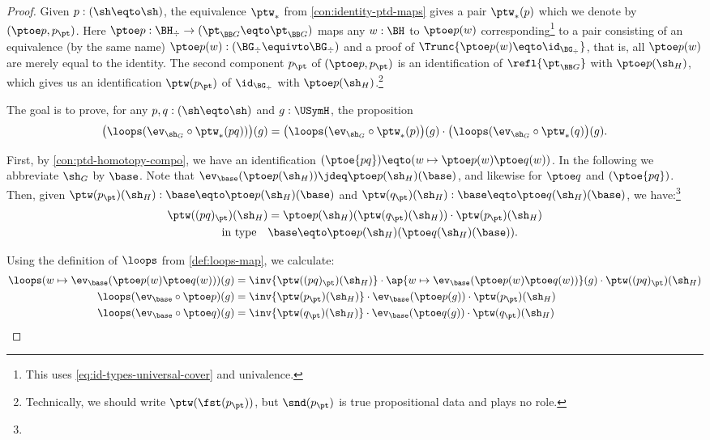 \begin{proof}
Given $p:(\sh\eqto\sh)$, the equivalence $\ptw_*$ from 
\cref{con:identity-ptd-maps} gives a pair $\ptw_*(p)$ which
we denote by $(\ptoe p,p_\pt)$. Here 
$\ptoe p :\BH_\div\to(\pt_{\BB G}\eqto\pt_{\BB G})$ maps any $w:\BH$ to 
$\ptoe p(w)$ corresponding\footnote{%
This uses \cref{eq:id-types-universal-cover} and univalence.}
to a pair consisting of an equivalence (by the same name)
$\ptoe p(w):(\BG_\div\equivto\BG_\div)$ and a proof of
$\Trunc{\ptoe p(w) \eqto \id_{\BG_\div}}$, that is,
all $\ptoe p(w)$ are merely equal to the identity.
The second component $p_\pt$ of $(\ptoe p,p_\pt)$ is an
identification of $\refl{\pt_{\BB G}}$ with $\ptoe p(\sh_H)$,
which gives us an identification $\ptw(p_\pt)$ of 
$\id_{\BG_\div}$ with $\ptoe p(\sh_H)$.\footnote{%
Technically, we should write $\ptw(\fst(p_\pt))$,
but $\snd(p_\pt)$ is true propositional data and plays no role.}

The goal is to prove, for any $p,q:(\sh\eqto\sh)$ and $g:\USymH$, 
the proposition
\[
\bigl(\loops(\ev_{\sh_G}\circ \ptw_*(pq))\bigr)(g) = 
\bigl(\loops(\ev_{\sh_G}\circ \ptw_*(p)\bigr)(g)\cdot
\bigl(\loops(\ev_{\sh_G}\circ \ptw_*(q)\bigr)(g).
\]

First, by \cref{con:ptd-homotopy-compo}, we have an identification 
$(\ptoe{pq})\eqto(w\mapsto \ptoe p(w) \ptoe q(w))$.
In the following we abbreviate $\sh_G$ by $\base$. 
Note that $\ev_\base(\ptoe p(\sh_H))\jdeq \ptoe p(\sh_H)(\base)$, 
and likewise for $\ptoe q$ and $(\ptoe{pq})$.
Then, given $\ptw(p_\pt)(\sh_H): \base \eqto \ptoe p(\sh_H)(\base)$
and $\ptw(q_\pt)(\sh_H) : \base \eqto \ptoe q(\sh_H)(\base)$,
we have:\footnote{}
\begin{align*}
\ptw((pq)_\pt)(\sh_H) &= \ptoe p(\sh_H)(\ptw(q_\pt)(\sh_H))\cdot \ptw(p_\pt)(\sh_H)\\
 \text{~in~type}\quad
&\base \eqto \ptoe p(\sh_H)(\ptoe q(\sh_H)(\base)).
\end{align*}

Using the definition of $\loops$ from \cref{def:loops-map},
we calculate:
\begin{align*}
\loops(w\mapsto \ev_{\base}(\ptoe p(w)\ptoe q(w)))(g) &= 
\inv{\ptw((pq)_\pt)(\sh_H)}\cdot \ap{w\mapsto \ev_{\base}(\ptoe p(w)\ptoe q(w))}(g) \cdot {\ptw((pq)_\pt)(\sh_H)}\\
\loops(\ev_{\base}\circ \ptoe p)(g) &= 
\inv{\ptw(p_\pt)(\sh_H)} \cdot \ev_{\base}(\ptoe p(g)) \cdot {\ptw(p_\pt)(\sh_H)}\\
\loops(\ev_{\base}\circ \ptoe q)(g) &= 
\inv{\ptw(q_\pt)(\sh_H)} \cdot \ev_{\base}(\ptoe q(g)) \cdot {\ptw(q_\pt)(\sh_H)}
\end{align*}


\end{proof}
